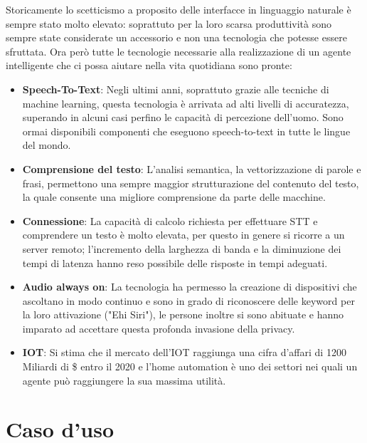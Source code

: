 \documentclass[twoside]{supsistudent}
\begin{document}
Storicamente lo scetticismo a proposito delle interfacce in linguaggio naturale è sempre stato molto elevato: soprattuto per la loro scarsa produttività sono sempre state considerate un accessorio e non una tecnologia che potesse essere sfruttata.
Ora però tutte le tecnologie necessarie alla realizzazione di un agente intelligente che ci possa aiutare nella vita quotidiana sono pronte:
\begin{itemize}
  \item \textbf{Speech-To-Text}: Negli ultimi anni, soprattuto grazie alle tecniche di machine learning, questa tecnologia è arrivata ad alti livelli di accuratezza, superando in alcuni casi perfino le capacità di percezione dell'uomo. Sono ormai disponibili componenti che eseguono speech-to-text in tutte le lingue del mondo.
   \item \textbf{Comprensione del testo}: L'analisi semantica, la  vettorizzazione di parole e frasi, permettono una sempre maggior strutturazione del contenuto del testo, la quale consente una migliore comprensione da parte delle macchine.
    \item \textbf{Connessione}: La capacità di calcolo richiesta per effettuare STT e comprendere un testo è molto elevata, per questo in genere si ricorre a un server remoto; l'incremento della larghezza di banda e la diminuzione dei tempi di latenza hanno reso possibile delle risposte in tempi adeguati.
     \item \textbf{Audio always on}: La tecnologia ha permesso la creazione di dispositivi che ascoltano in modo continuo e sono in grado di riconoscere delle keyword per la loro attivazione ("Ehi Siri"), le persone inoltre si sono abituate e hanno imparato ad accettare questa profonda invasione della privacy.
     \item \textbf{IOT}: Si stima che il mercato dell'IOT raggiunga una cifra d'affari di 1200 Miliardi di \$ entro il 2020 e l'home automation è uno dei settori nei quali un agente può raggiungere la sua massima utilità. 
\end{itemize}

\chapter{Caso d'uso}
\end{document}
